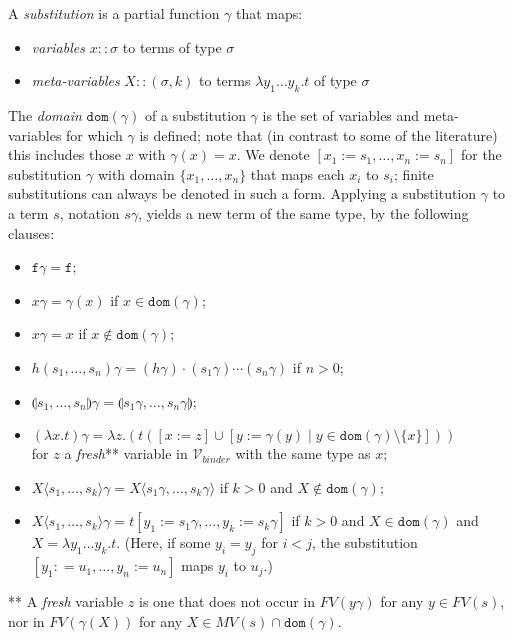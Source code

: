 \documentclass{lmcs}
\theoremstyle{theorem}\newtheorem{theorem}{Theorem}
\theoremstyle{theorem}\newtheorem{lemma}[theorem]{Lemma}
\theoremstyle{theorem}\newtheorem{corollary}[theorem]{Corollary}
\theoremstyle{definition}\newtheorem{definition}[theorem]{Definition}
\theoremstyle{definition}\newtheorem{example}[theorem]{Example}
\newcommand{\Vbound}{\mathcal{V}_{\mathit{binder}}}
\newcommand{\FV}{\mathit{FV}}
\newcommand{\FMV}{\mathit{MV}}
\newcommand{\domain}{\mathtt{dom}}
\newcommand{\atype}{\sigma}
\newcommand{\identifier}[1]{\mathtt{#1}}
\newcommand{\afun}{\identifier{f}}
\newcommand{\avar}{x}
\newcommand{\bvar}{y}
\newcommand{\cvar}{z}
\newcommand{\Avar}{X}
\newcommand{\Cvar}{Z}
\newcommand{\abs}[2]{\lambda #1.#2}
\newcommand{\meta}[2]{#1\langle#2\rangle}
\newcommand{\tuple}[2]{\llparenthesis #1,\dots,#2 \rrparenthesis}
\begin{document}
A \emph{substitution} is a partial function $\gamma$ that maps:
\begin{itemize}
\item \emph{variables} $\avar :: \atype$ to terms of type $\atype$
\item \emph{meta-variables} $\Avar :: (\atype,k)$ to terms $\abs{\bvar_1 \dots
  \bvar_k}{t}$ of type $\atype$
\end{itemize}
The \emph{domain} $\domain(\gamma)$ of a substitution $\gamma$ is the set of
variables and meta-variables for which $\gamma$ is defined; note that (in
contrast to some of the literature) this includes those $\avar$ with
$\gamma(\avar) = \avar$.
We denote $[x_1:=s_1,\dots,x_n:=s_n]$ for the substitution $\gamma$ with
domain $\{x_1,\dots,x_n\}$ that maps each $x_i$ to $s_i$; finite substitutions
can always be denoted in such a form.
Applying a substitution $\gamma$ to a term $s$, notation $s\gamma$, yields a
new term of the same type, by the following clauses:

\begin{itemize}
\item $\afun\gamma = \afun$;
\item $\avar\gamma = \gamma(\avar)$ if $\avar \in \domain(\gamma)$;
\item $\avar\gamma = \avar$ if $\avar \notin \domain(\gamma)$;
\item $h(s_1,\dots,s_n)\gamma = (h\gamma) \cdot (s_1\gamma) \cdots (s_n\gamma)$
  if $n > 0$;
\item $\tuple{s_1}{s_n}\gamma = \tuple{s_1\gamma}{s_n\gamma}$;
\item $(\abs{\avar}{t})\gamma = \abs{\cvar}{(t ([\avar:=\cvar] \cup [\bvar:=
  \gamma(\bvar) \mid \bvar \in \domain(\gamma) \setminus \{\avar\}]))}$ \\
  for $\cvar$ a \emph{fresh}** variable in $\Vbound$ with the same type as
  $\avar$;
\item $\meta{\Avar}{s_1,\dots,s_k}\gamma = \meta{\Avar}{s_1\gamma,\dots,s_k
  \gamma}$ if $k > 0$ and $\Avar \notin \domain(\gamma)$;
\item $\meta{\Avar}{s_1,\dots,s_k}\gamma = t[\bvar_1:=s_1\gamma,\dots,\bvar_k:=
  s_k\gamma]$ if $k > 0$ and $\Avar \in \domain(\gamma)$ and $\Avar =
  \abs{\bvar_1 \dots \bvar_k}{t}$.
  (Here, if some $\bvar_i = \bvar_j$ for $i < j$, the substitution $[\bvar_1:
  =u_1,\dots,\bvar_n:=u_n]$ maps $\bvar_i$ to $u_j$.)
\end{itemize}
** A \emph{fresh} variable $\cvar$ is one that does not occur in
$\FV(\bvar\gamma)$ for any $\bvar \in \FV(s)$, nor in
$\FV(\gamma(\Avar))$ for any $\Avar \in \FMV(s) \cap \domain(\gamma)$.
\end{document}
